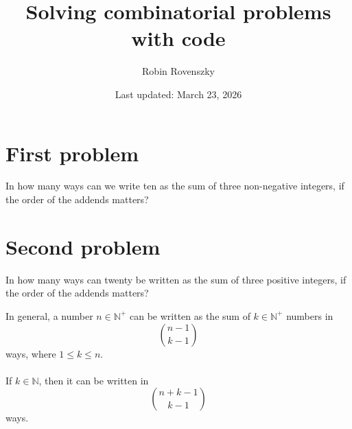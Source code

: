 \documentclass{article}
\title{Solving combinatorial problems with code}
\author{Robin Rovenszky}
\date{Last updated: March 23, 2026}
\begin{document}
\maketitle
\tableofcontents
\newpage
\section{First problem}
In how many ways can we write ten as the sum of three non-negative integers, if the order of the addends matters?

\section{Second problem}
In how many ways can twenty be written as the sum of three positive integers, if the order of the addends matters?

In general, a number $n \in \mathbb{N}^+$ can be written as the sum of $k \in \mathbb{N}^+$ numbers in
\[
\binom{n-1}{k-1}
\]
ways, where $1 \le k \le n$.\\\\
If $k \in \mathbb{N}$, then it can be written in
\[
\binom{n + k - 1}{k - 1}
\]
ways.
\end{document}
